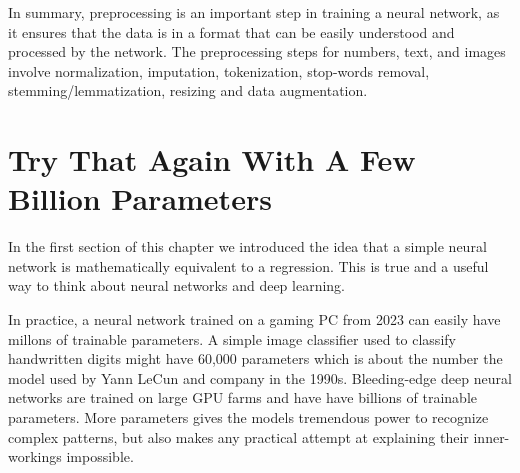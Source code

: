 In summary, preprocessing is an important step in training a neural network, as it ensures that the data is in a format that can be easily understood and processed by the network. The preprocessing steps for numbers, text, and images involve normalization, imputation, tokenization, stop-words removal, stemming/lemmatization, resizing and data augmentation.

\section{Try That Again With A Few Billion Parameters}

In the first section of this chapter we introduced the idea that a simple neural network is mathematically equivalent to a regression. This is true and a useful way to think about neural networks and deep learning.  

In practice, a neural network trained on a gaming PC from 2023 can easily have millons of trainable parameters. A simple image classifier used to classify handwritten digits might have 60,000 parameters which is about the number the model used by Yann LeCun and company in the 1990s. Bleeding-edge deep neural networks are trained on large GPU farms and have have billions of trainable parameters. More parameters gives the models tremendous power to recognize complex patterns, but also makes any practical attempt at explaining their inner-workings impossible.  



